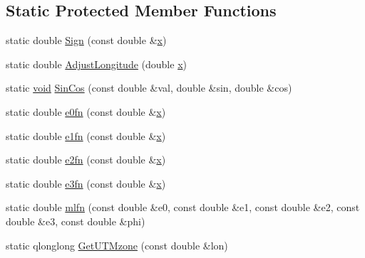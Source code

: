 \subsection*{\-Static \-Protected \-Member \-Functions}
\begin{DoxyCompactItemize}
\item 
static double \hyperlink{group___o_p_map_widget_gaee27ced7a956221b25376a3a66d24225}{\-Sign} (const double \&\hyperlink{_o_p_plots_8m_a9336ebf25087d91c818ee6e9ec29f8c1}{x})
\item 
static double \hyperlink{group___o_p_map_widget_gafa614e10aa8fca4d1efadf7dd2afe24f}{\-Adjust\-Longitude} (double \hyperlink{_o_p_plots_8m_a9336ebf25087d91c818ee6e9ec29f8c1}{x})
\item 
static \hyperlink{group___u_a_v_objects_plugin_ga444cf2ff3f0ecbe028adce838d373f5c}{void} \hyperlink{group___o_p_map_widget_gac2ded9931569402c0332f2eb88775291}{\-Sin\-Cos} (const double \&val, double \&sin, double \&cos)
\item 
static double \hyperlink{group___o_p_map_widget_ga1431f7528de2f5e7e46a1fc112e57d9e}{e0fn} (const double \&\hyperlink{_o_p_plots_8m_a9336ebf25087d91c818ee6e9ec29f8c1}{x})
\item 
static double \hyperlink{group___o_p_map_widget_ga3887fec80271d2bb2ad73cd33cd133f6}{e1fn} (const double \&\hyperlink{_o_p_plots_8m_a9336ebf25087d91c818ee6e9ec29f8c1}{x})
\item 
static double \hyperlink{group___o_p_map_widget_gaf1cb887c1701e60dd8e1b86620fdfc0e}{e2fn} (const double \&\hyperlink{_o_p_plots_8m_a9336ebf25087d91c818ee6e9ec29f8c1}{x})
\item 
static double \hyperlink{group___o_p_map_widget_ga42266b37884ed2a7b650fdd830dd2ce2}{e3fn} (const double \&\hyperlink{_o_p_plots_8m_a9336ebf25087d91c818ee6e9ec29f8c1}{x})
\item 
static double \hyperlink{group___o_p_map_widget_ga5be16c4bd50c6869390aa8e1fa81d44d}{mlfn} (const double \&e0, const double \&e1, const double \&e2, const double \&e3, const double \&phi)
\item 
static qlonglong \hyperlink{group___o_p_map_widget_ga4fe99842f3ee0de090c40b11999ab860}{\-Get\-U\-T\-Mzone} (const double \&lon)
\end{DoxyCompactItemize}
